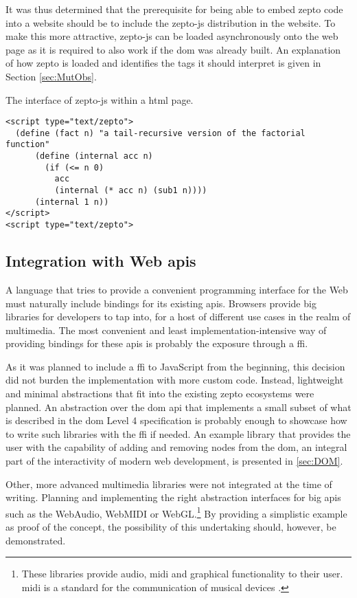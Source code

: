 \documentclass[oneside,11pt,xetex]{scrbook}
\begin{document}
It was thus determined that the prerequisite for being able to embed zepto code into
a website should be to include the zepto-js distribution in the website. To make
this more attractive, zepto-js can be loaded asynchronously onto the web page as it
is required to also work if the \gls{dom} was already built. An explanation of how
zepto is loaded and identifies the tags it should interpret is given in Section \ref{sec:MutObs}.

\begin{listing}[H]
\caption{The interface of zepto-js within a \gls{html} page.}
\begin{verbatim}
<script type="text/zepto">
  (define (fact n) "a tail-recursive version of the factorial function"
      (define (internal acc n)
        (if (<= n 0)
          acc
          (internal (* acc n) (sub1 n))))
      (internal 1 n))
</script>
<script type="text/zepto">
\end{verbatim}
\label{fig:zpjs}
\end{listing}

\subsection{Integration with Web \glspl{api}}

A language that tries to provide a convenient programming interface for the Web must
naturally include bindings for its existing \glspl{api}. Browsers provide big libraries
for developers to tap into, for a host of different use cases in the realm of multimedia.
The most convenient and least implementation-intensive way of providing bindings for
these \glspl{api} is probably the exposure through a \gls{ffi}.

As it was planned to include a \gls{ffi} to JavaScript from the beginning, this decision
did not burden the implementation with more custom code. Instead, lightweight and minimal
abstractions that fit into the existing zepto ecosystems were planned. An abstraction
over the \gls{dom} \gls{api} that implements a small subset of what is described in
the \gls{dom} Level 4 specification \parencite{DOM4} is probably enough to showcase how to
write such libraries with the \gls{ffi} if needed. An example library that provides the
user with the capability of adding and removing nodes from the \gls{dom}, an integral
part of the interactivity of modern web development, is presented in \ref{sec:DOM}.

Other, more advanced multimedia libraries were not integrated at the time of writing.
Planning and implementing the right abstraction interfaces for big \glspl{api} such as
the WebAudio, WebMIDI or WebGL.\footnote{These libraries provide audio, \gls{midi} and
graphical functionality to their user. \gls{midi} is a standard for the communication
of musical devices \parencite{MIDI}.} By providing a simplistic example as proof
of the concept, the possibility of this undertaking should, however, be demonstrated.
\end{document}
